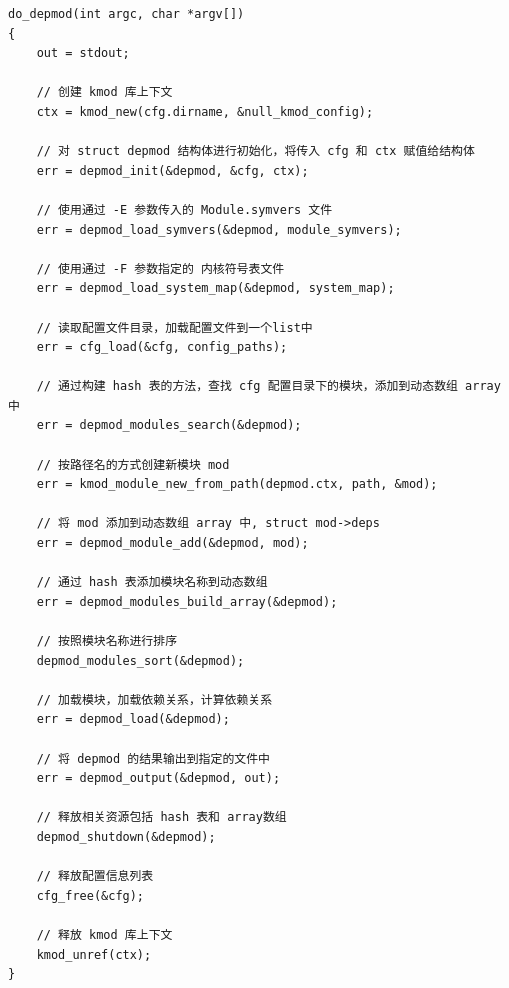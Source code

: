 \documentclass[11pt,a4paper]{article}
\begin{document}
{\begin{shaded}\begin{verbatim}
do_depmod(int argc, char *argv[])
{
    out = stdout;   

    // 创建 kmod 库上下文
    ctx = kmod_new(cfg.dirname, &null_kmod_config);

    // 对 struct depmod 结构体进行初始化，将传入 cfg 和 ctx 赋值给结构体
    err = depmod_init(&depmod, &cfg, ctx);

    // 使用通过 -E 参数传入的 Module.symvers 文件
    err = depmod_load_symvers(&depmod, module_symvers);

    // 使用通过 -F 参数指定的 内核符号表文件
    err = depmod_load_system_map(&depmod, system_map);

    // 读取配置文件目录，加载配置文件到一个list中
    err = cfg_load(&cfg, config_paths);

    // 通过构建 hash 表的方法，查找 cfg 配置目录下的模块，添加到动态数组 array 中
    err = depmod_modules_search(&depmod);

    // 按路径名的方式创建新模块 mod
    err = kmod_module_new_from_path(depmod.ctx, path, &mod);

    // 将 mod 添加到动态数组 array 中, struct mod->deps
    err = depmod_module_add(&depmod, mod);

    // 通过 hash 表添加模块名称到动态数组 
    err = depmod_modules_build_array(&depmod);

    // 按照模块名称进行排序
    depmod_modules_sort(&depmod);

    // 加载模块，加载依赖关系，计算依赖关系
    err = depmod_load(&depmod);

    // 将 depmod 的结果输出到指定的文件中
    err = depmod_output(&depmod, out);

    // 释放相关资源包括 hash 表和 array数组
    depmod_shutdown(&depmod);

    // 释放配置信息列表
    cfg_free(&cfg);

    // 释放 kmod 库上下文
    kmod_unref(ctx);
}
\end{verbatim}\end{shaded}}
\end{document}
